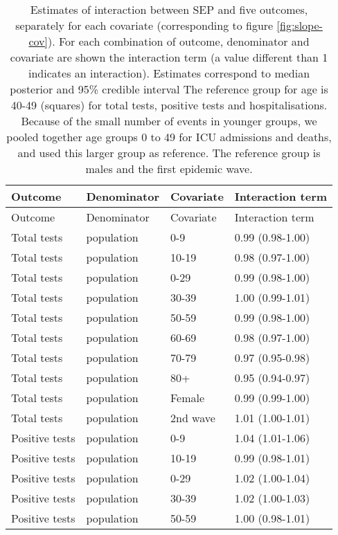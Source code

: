 \documentclass{article}
\begin{document}
		\begin{longtable}{llll}
			
			\caption{Estimates of interaction between SEP and five outcomes, separately for each covariate (corresponding to figure \ref{fig:slope-cov}). For each combination of outcome, denominator and covariate are shown the interaction term (a value different than 1 indicates an interaction). Estimates correspond to median posterior and 95\% credible interval The reference group for age is 40-49 (squares) for total tests, positive tests and hospitalisations. Because of the small number of events in younger groups, we pooled together age groups 0 to 49 for ICU admissions and deaths, and used this larger group as reference. The reference group is males and the first epidemic wave. }
			\label{tab:slope-cov} \\
			\hline
			Outcome & Denominator & Covariate & Interaction term \\ 
			\hline
			\endfirsthead
			\hline
			Outcome & Denominator & Covariate & Interaction term \\ 
			\hline
			\endhead
		Total tests & population & 0-9 & 0.99 (0.98-1.00) \\ 
		Total tests & population & 10-19 & 0.98 (0.97-1.00) \\ 
		Total tests & population & 0-29 & 0.99 (0.98-1.00) \\ 
		Total tests & population & 30-39 & 1.00 (0.99-1.01) \\ 
		Total tests & population & 50-59 & 0.99 (0.98-1.00) \\ 
		Total tests & population & 60-69 & 0.98 (0.97-1.00) \\ 
		Total tests & population & 70-79 & 0.97 (0.95-0.98) \\ 
		Total tests & population & 80+ & 0.95 (0.94-0.97) \\ 
		Total tests & population & Female & 0.99 (0.99-1.00) \\ 
		Total tests & population & 2nd wave & 1.01 (1.00-1.01) \\ 
		Positive tests & population & 0-9 & 1.04 (1.01-1.06) \\ 
		Positive tests & population & 10-19 & 0.99 (0.98-1.01) \\ 
		Positive tests & population & 0-29 & 1.02 (1.00-1.04) \\ 
		Positive tests & population & 30-39 & 1.02 (1.00-1.03) \\ 
		Positive tests & population & 50-59 & 1.00 (0.98-1.01) \\ 

\end{longtable}
\end{document}
